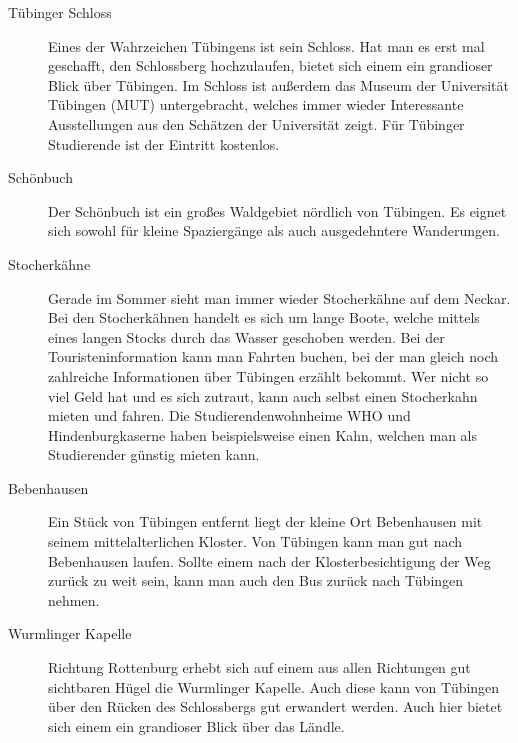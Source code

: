 \begin{description}
\item[Tübinger Schloss] Eines der Wahrzeichen Tübingens ist sein Schloss. Hat man es erst mal geschafft, den Schlossberg hochzulaufen, bietet sich einem ein grandioser Blick über Tübingen. Im Schloss ist außerdem das Museum der Universität Tübingen (MUT) untergebracht, welches immer wieder Interessante Ausstellungen aus den Schätzen der Universität zeigt. Für Tübinger Studierende ist der Eintritt kostenlos.

\item[Schönbuch] Der Schönbuch ist ein großes Waldgebiet nördlich von Tübingen. Es eignet sich sowohl für kleine Spaziergänge als auch ausgedehntere Wanderungen.

\item[Stocherkähne]
Gerade im Sommer sieht man immer wieder Stocherkähne auf dem Neckar. Bei den Stocherkähnen handelt es sich um lange Boote, welche mittels eines langen Stocks durch das Wasser geschoben werden. Bei der Touristeninformation kann man Fahrten buchen, bei der man gleich noch zahlreiche Informationen über Tübingen erzählt bekommt. Wer nicht so viel Geld hat und es sich zutraut, kann auch selbst einen Stocherkahn mieten und fahren. Die Studierendenwohnheime WHO und Hindenburgkaserne haben beispielsweise einen Kahn, welchen man als Studierender günstig mieten kann.


\item[Bebenhausen]
Ein Stück von Tübingen entfernt liegt der kleine Ort Bebenhausen mit seinem mittelalterlichen Kloster. Von Tübingen kann man gut nach Bebenhausen laufen. Sollte einem nach der Klosterbesichtigung der Weg zurück zu weit sein, kann man auch den Bus zurück nach Tübingen nehmen.

\item[Wurmlinger Kapelle]
Richtung Rottenburg erhebt sich auf einem aus allen Richtungen gut sichtbaren Hügel die Wurmlinger Kapelle. Auch diese kann von Tübingen über den Rücken des Schlossbergs gut erwandert werden. Auch hier bietet sich einem ein grandioser Blick über das Ländle.



\end{description}
